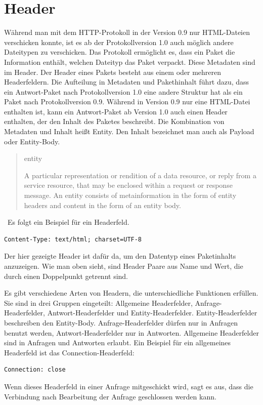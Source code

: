 \documentclass{llncs}
\begin{document}
\section{Header}
Während man mit dem HTTP-Protokoll in der Version 0.9 nur HTML-Dateien verschicken konnte, ist es ab der Protokollversion 1.0 auch möglich andere Dateitypen zu verschicken. Das Protokoll ermöglicht es, dass ein Paket die Information enthält, welchen Dateityp das Paket verpackt. Diese Metadaten sind im Header. Der Header eines Pakets besteht aus einem oder mehreren Headerfeldern. Die Aufteilung in Metadaten und Pakethinhalt führt dazu, dass ein Antwort-Paket nach Protokollversion 1.0 eine andere Struktur hat als ein Paket nach Protokollversion 0.9. Während in Version 0.9 nur eine HTML-Datei enthalten ist, kann ein Antwort-Paket ab Version 1.0 auch einen Header enthalten, der den Inhalt des Paketes beschreibt. Die Kombination von Metadaten und Inhalt heißt Entity. Den Inhalt bezeichnet man auch als Payload oder Entity-Body.
\begin{quote}   entity \linebreak

       A particular representation or rendition of a data resource, or
       reply from a service resource, that may be enclosed within a
       request or response message. An entity consists of
       metainformation in the form of entity headers and content in the
       form of an entity body. \cite{Berners-Lee1996} \end{quote} \
   Es folgt ein Beispiel für ein Headerfeld.
\begin{verbatim}
Content-Type: text/html; charset=UTF-8
\end{verbatim}
Der hier gezeigte Header ist dafür da, um den Datentyp eines Paketinhalts anzuzeigen. Wie man oben sieht, sind Header Paare aus Name und Wert, die durch einen Doppelpunkt getrennt sind.

Es gibt verschiedene Arten von Headern, die unterschiedliche Funktionen erfüllen. Sie sind in drei Gruppen eingeteilt: Allgemeine Headerfelder, Anfrage-Headerfelder, Antwort-Headerfelder und Entity-Headerfelder.
Entity-Headerfelder beschreiben den Entity-Body. Anfrage-Headerfelder dürfen nur in Anfragen benutzt werden, Antwort-Headerfelder nur in Antworten.  Allgemeine Headerfelder sind in Anfragen und Antworten erlaubt. Ein Beispiel für ein allgemeines Headerfeld ist das Connection-Headerfeld: 

\begin{verbatim}
Connection: close
\end{verbatim}
Wenn dieses Headerfeld in einer Anfrage mitgeschickt wird, sagt es aus, dass die Verbindung nach Bearbeitung der Anfrage geschlossen werden kann. 
\end{document}
